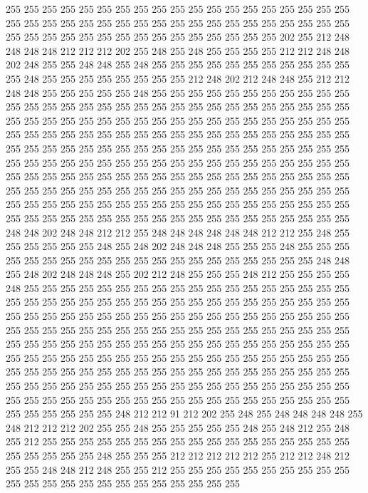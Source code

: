 255 255 255 255 255 255 255 255 255 255 255 255 255 255 255 255 255 255 255 255
255 255 255 255 255 255 255 255 255 255 255 255 255 255 255 255 255 255 255 255
255 255 255 255 255 255 255 255 255 255 255 255 255 202 255 212 248 248 248 248
212 212 212 202 255 248 255 248 255 255 255 255 212 212 248 248 202 248 255 255
248 248 255 248 255 255 255 255 255 255 255 255 255 255 255 255 248 255 255 255
255 255 255 255 255 212 248 202 212 248 248 255 212 212 248 248 255 255 255 255
255 248 255 255 255 255 255 255 255 255 255 255 255 255 255 255 255 255 255 255
255 255 255 255 255 255 255 255 255 255 255 255 255 255 255 255 255 255 255 255
255 255 255 255 255 255 255 255 255 255 255 255 255 255 255 255 255 255 255 255
255 255 255 255 255 255 255 255 255 255 255 255 255 255 255 255 255 255 255 255
255 255 255 255 255 255 255 255 255 255 255 255 255 255 255 255 255 255 255 255
255 255 255 255 255 255 255 255 255 255 255 255 255 255 255 255 255 255 255 255
255 255 255 255 255 255 255 255 255 255 255 255 255 255 255 255 255 255 255 255
255 255 255 255 255 255 255 255 255 255 255 255 255 255 255 255 255 255 255 255
255 255 255 255 255 255 255 255 255 255 255 255 255 255 255 255 255 255 255 255
255 255 255 255 248 248 202 248 248 212 212 255 248 248 248 248 248 248 212 212
255 248 255 255 255 255 255 255 248 255 248 202 248 248 248 255 255 255 248 255
255 255 255 255 255 255 255 255 255 255 255 255 255 255 255 255 255 255 255 248
248 255 248 202 248 248 248 255 202 212 248 255 255 255 248 212 255 255 255 255
248 255 255 255 255 255 255 255 255 255 255 255 255 255 255 255 255 255 255 255
255 255 255 255 255 255 255 255 255 255 255 255 255 255 255 255 255 255 255 255
255 255 255 255 255 255 255 255 255 255 255 255 255 255 255 255 255 255 255 255
255 255 255 255 255 255 255 255 255 255 255 255 255 255 255 255 255 255 255 255
255 255 255 255 255 255 255 255 255 255 255 255 255 255 255 255 255 255 255 255
255 255 255 255 255 255 255 255 255 255 255 255 255 255 255 255 255 255 255 255
255 255 255 255 255 255 255 255 255 255 255 255 255 255 255 255 255 255 255 255
255 255 255 255 255 255 255 255 255 255 255 255 255 255 255 255 255 255 255 255
255 255 255 255 255 255 255 255 255 255 255 255 255 255 255 255 255 248 212 212
91 212 202 255 248 255 248 248 248 248 255 248 212 212 212 202 255 255 248 255
255 255 255 255 248 255 248 212 255 248 255 212 255 255 255 255 255 255 255 255
255 255 255 255 255 255 255 255 255 255 255 255 255 255 248 255 255 255 212 212
212 212 212 255 212 212 248 212 255 255 248 248 212 248 255 255 212 255 255 255
255 255 255 255 255 255 255 255 255 255 255 255 255 255 255 255 255 255 255 255
